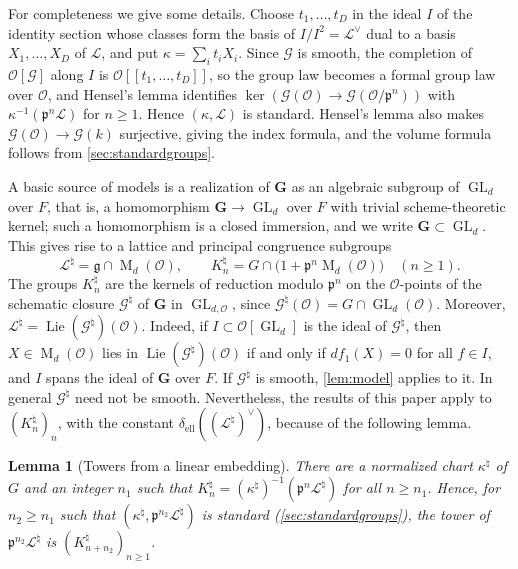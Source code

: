 \documentclass[11pt,reqno]{amsart}
\numberwithin{equation}{section}
\theoremstyle{plain}
\newtheorem{lemma}[theorem]{Lemma}
\theoremstyle{definition}
\theoremstyle{remark}
\theoremstyle{plain}
\newcommand{\OO}{\mathcal{O}}    %
\newcommand{\pp}{\mathfrak{p}}   %
\newcommand{\Lat}{\mathcal{L}}   %
\newcommand{\bG}{\mathbf{G}}     %
\newcommand{\g}{\mathfrak{g}}    %
\newcommand{\elld}[2][]{\delta_{\mathrm{ell}}^{#1}(#2)}  %
\newcommand{\cG}{\mathcal{G}}                   %
\DeclareMathOperator{\Lie}{Lie}
\DeclareMathOperator{\GL}{GL}
\DeclareMathOperator{\Mat}{M}
\newcommand{\nchart}{normalized chart}
\begin{document}
For completeness we give some details.
Choose $t_1,\dots,t_D$ in the ideal $I$ of the identity
section whose classes form the basis of $I/I^2=\Lat^\vee$ dual to a basis
$X_1,\dots,X_D$ of $\Lat$, and put $\kappa=\sum_it_iX_i$. Since $\cG$ is
smooth, the completion of $\OO[\cG]$ along $I$ is $\OO[[t_1,\dots,t_D]]$, so
the group law becomes a formal group law over $\OO$, and Hensel's lemma
identifies $\ker(\cG(\OO)\to\cG(\OO/\pp^n))$ with $\kappa^{-1}(\pp^n\Lat)$
for $n\ge1$. Hence $(\kappa,\Lat)$ is standard. Hensel's lemma also
makes $\cG(\OO)\to\cG(k)$ surjective, giving the index formula, and the
volume formula follows from \cref{sec:standardgroups}.

A basic source of models is a realization of $\bG$ as an algebraic subgroup
of $\GL_d$ over $F$, that is, a homomorphism $\bG\to\GL_d$ over $F$ with trivial
scheme-theoretic kernel; such a homomorphism is a closed immersion, and we
write $\bG\subset\GL_d$. This gives rise to a lattice and principal congruence subgroups
\begin{equation}\label{eq:embeddingtower}
\Lat^\natural=\g\cap\Mat_d(\OO),\qquad
K^\natural_n=G\cap\bigl(1+\pp^n\Mat_d(\OO)\bigr)\quad(n\ge1).
\end{equation}
The groups $K^\natural_n$ are the kernels of reduction modulo $\pp^n$ on the
$\OO$-points of the schematic closure $\cG^\natural$ of $\bG$ in
$\GL_{d,\OO}$, since $\cG^\natural(\OO)=G\cap\GL_d(\OO)$.
Moreover, $\Lat^\natural=\Lie(\cG^\natural)(\OO)$. Indeed, if
$I\subset\OO[\GL_d]$ is the
ideal of $\cG^\natural$, then $X\in\Mat_d(\OO)$ lies in
$\Lie(\cG^\natural)(\OO)$ if and only if $df_1(X)=0$ for all $f\in I$, and
$I$ spans the ideal of $\bG$ over $F$. If $\cG^\natural$ is smooth,
\cref{lem:model} applies to it. In general $\cG^\natural$ need not be
smooth. Nevertheless, the results of this paper apply to $(K^\natural_n)_n$,
with the constant $\elld{(\Lat^\natural)^\vee}$, because of the following lemma.


\begin{lemma}[Towers from a linear embedding]\label{lem:embedding}
There are a \nchart{} $\kappa^\natural$ of $G$ and an integer $n_1$ such that
$K^\natural_n=(\kappa^\natural)^{-1}(\pp^n\Lat^\natural)$ for all
$n\ge n_1$. Hence, for $n_2\ge n_1$ such that
$(\kappa^\natural,\pp^{n_2}\Lat^\natural)$ is standard
(\cref{sec:standardgroups}), the tower of $\pp^{n_2}\Lat^\natural$ is
$(K^\natural_{n+n_2})_{n\ge1}$.
\end{lemma}
\end{document}
